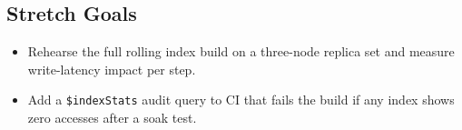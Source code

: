 \subsection*{Stretch Goals}
\begin{itemize}
    \item Rehearse the full rolling index build on a three-node replica set and measure write-latency impact per step.
    \item Add a \texttt{\$indexStats} audit query to CI that fails the build if any index shows zero accesses after a soak test.
\end{itemize}
